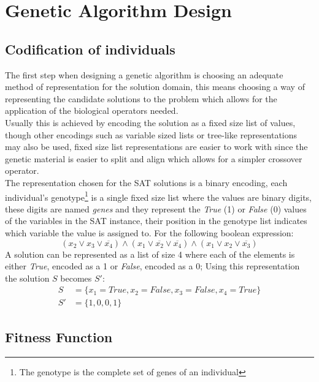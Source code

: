 \section{Genetic Algorithm Design}
\label{section:ga_design}

\subsection{Codification of individuals}

The first step when designing a genetic algorithm is choosing an adequate method of representation for the solution domain, this means choosing a way of representing the candidate solutions to the problem which allows for the application of the biological operators needed. 
\\Usually this is achieved by encoding the solution as a fixed size list of values, though other encodings such as variable sized lists or tree-like representations may also be used, fixed size list representations are easier to work with since the genetic material is easier to split and align which allows for a simpler crossover operator.
\\The representation chosen for the SAT solutions is a binary encoding, each individual's genotype\footnote{The genotype is the complete set of genes of an individual} is a single fixed size list where the values are binary digits, these digits are named \textit{genes} and they represent the \textit{True} (1) or \textit{False} (0) values of the variables in the SAT instance, their position in the genotype list indicates which variable the value is assigned to. For the following boolean expression:
\begin{equation*}
 (x_2 \lor x_3 \lor \overline{x_4}) \land (x_1 \lor \overline{x_2} \lor \overline{x_4}) \land (x_1 \lor x_2 \lor \overline{x_3})
\end{equation*}
A solution can be represented as a list of size 4 where each of the elements is either \textit{True}, encoded as a 1 or \textit{False}, encoded as a 0; Using this representation the solution $S$ becomes $S'$:
\begin{equation*}
\begin{split}
S & = \{x_1=True, x_2=False, x_3=False, x_4=True \}
\\S' & = \{1,0,0,1\}
\end{split}
\end{equation*}

\subsection{Fitness Function}

